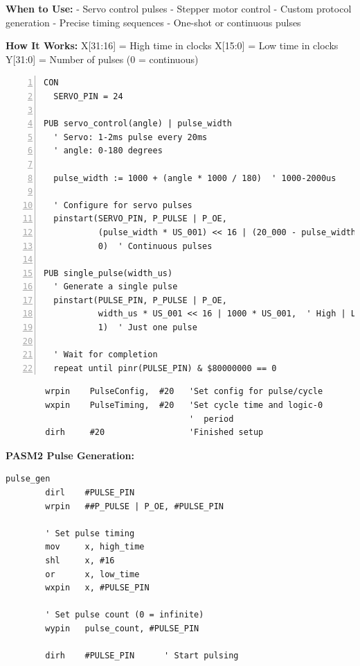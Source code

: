 \documentclass[11pt,a4paper,oneside,english]{book}
\begin{document}
\textbf{When to Use:} - Servo control pulses - Stepper motor control -
Custom protocol generation - Precise timing sequences - One-shot or
continuous pulses

\textbf{How It Works:} X{[}31:16{]} = High time in clocks X{[}15:0{]} =
Low time in clocks Y{[}31:0{]} = Number of pulses (0 = continuous)

\begin{Spin2Block}
\begin{Verbatim}[numbers=left,numbersep=5pt,xleftmargin=15pt]
CON
  SERVO_PIN = 24
  
PUB servo_control(angle) | pulse_width
  ' Servo: 1-2ms pulse every 20ms
  ' angle: 0-180 degrees
  
  pulse_width := 1000 + (angle * 1000 / 180)  ' 1000-2000us
  
  ' Configure for servo pulses
  pinstart(SERVO_PIN, P_PULSE | P_OE, 
           (pulse_width * US_001) << 16 | (20_000 - pulse_width) * US_001, 
           0)  ' Continuous pulses

PUB single_pulse(width_us)
  ' Generate a single pulse
  pinstart(PULSE_PIN, P_PULSE | P_OE,
           width_us * US_001 << 16 | 1000 * US_001,  ' High | Low times
           1)  ' Just one pulse
  
  ' Wait for completion
  repeat until pinr(PULSE_PIN) & $80000000 == 0
\end{Verbatim}
\end{Spin2Block}

\begin{PASM2Block}
\begin{lstlisting}
        wrpin    PulseConfig,  #20   'Set config for pulse/cycle
        wxpin    PulseTiming,  #20   'Set cycle time and logic-0
                                     '  period
        dirh     #20                 'Finished setup
\end{lstlisting}
\end{PASM2Block}

\textbf{PASM2 Pulse Generation:}

\begin{PASM2Block}
\begin{lstlisting}
pulse_gen
        dirl    #PULSE_PIN
        wrpin   ##P_PULSE | P_OE, #PULSE_PIN
        
        ' Set pulse timing
        mov     x, high_time
        shl     x, #16
        or      x, low_time
        wxpin   x, #PULSE_PIN
        
        ' Set pulse count (0 = infinite)
        wypin   pulse_count, #PULSE_PIN
        
        dirh    #PULSE_PIN      ' Start pulsing
\end{lstlisting}
\end{PASM2Block}
\end{document}
